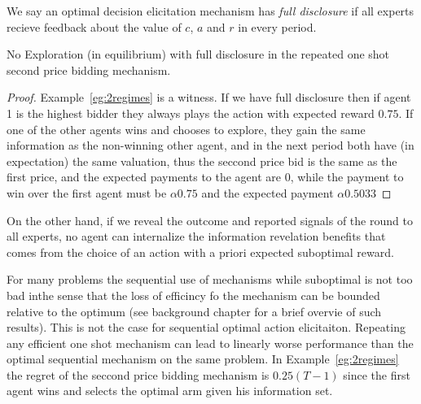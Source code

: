 \begin{def}
We say an optimal decision elicitation mechanism has \emph{full disclosure} if all experts recieve feedback about the value of $c$, $a$ and $r$ in every period.
\end{def}


\begin{lem}
No Exploration (in equilibrium) with full disclosure in the repeated one shot second price bidding mechanism.
\end{lem}

\begin{proof}
Example~\ref{eg:2regimes} is a witness. If we have full disclosure then if agent 1 is the highest bidder they always plays the action with expected reward $0.75$. If one of the other agents wins and chooses to explore, they gain the same information as the non-winning other agent, and in the next period both have (in expectation) the same valuation, thus the seccond price bid is the same as the first price, and the expected payments to the agent are 0, while the payment to win over the first agent must be $\alpha 0.75$ and the expected payment $\alpha 0.5033$
\end{proof}





On the other hand, if we reveal the outcome and reported signals of the round to all experts, no agent can internalize the information revelation benefits that comes from the choice of an action with a priori expected suboptimal reward.

For many problems the sequential use of mechanisms while suboptimal is not too bad inthe sense that the loss of efficincy fo the mechanism can be bounded relative to the optimum (see background chapter for a brief overvie of such results).
This is not the case for sequential optimal action elicitaiton. Repeating any efficient one shot mechanism can lead to linearly worse performance than the optimal sequential mechanism on the same problem. In Example~\ref{eg:2regimes} the regret of the  seccond price bidding mechanism is $0.25(T-1)$ since the first agent wins and selects the optimal arm given his information set.



